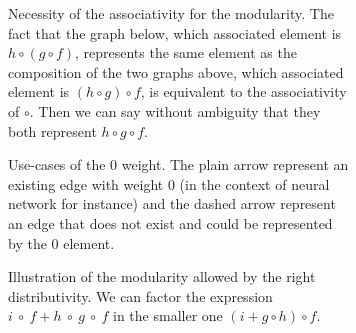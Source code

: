 \documentclass[11pt,a4paper]{article}
\begin{document}
\begin{figure}
\begin{subfigure}{\textwidth}
		\caption{Necessity of the associativity for the modularity. The fact that the graph below, which associated element is $h\circ (g \circ f)$, represents the same element as the composition of the two graphs above, which associated element is $(h \circ g) \circ f$, is equivalent to the associativity of $\circ$. Then we can say without ambiguity that they both represent $h \circ g \circ f$.}
	\end{subfigure}

	\begin{subfigure}{\textwidth}
		\centering
		\caption{Use-cases of the 0 weight. The plain arrow represent an existing edge with weight 0 (in the context of neural network for instance) and the dashed arrow represent an edge that does not exist and could be represented by the 0 element.}
	\end{subfigure}

	\begin{subfigure}{\textwidth}
		\centering
		\caption{Illustration of the modularity allowed by the right distributivity. We can factor the expression $i~\circ~f+h~\circ~g~\circ~f$ in the smaller one $(i + g \circ h) \circ f$.}
	\end{subfigure}

	\begin{subfigure}{\textwidth}
		\centering
\end{subfigure}
\end{figure}
\end{document}
